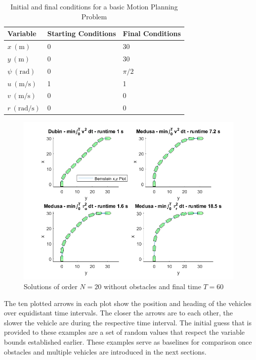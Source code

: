 \begin{table}[h!]
\centering
\begin{tabular}{|l|l|l|}
\hline
Variable & Starting Conditions & Final Conditions \\ \hline
$x\ (\si{\meter})$ & 0 & 30 \\
$y\ (\si{\meter})$ & 0 & 30 \\
$\psi\ (\si{\radian})$ & 0 & $\pi/2$ \\
$u\ (\si{\meter\per\second})$ & 1 & 1 \\
$v\ (\si{\meter\per\second})$ & 0 & 0 \\
$r\ (\si{\radian\per\second})$ & 0 & 0 \\
\hline
\end{tabular}
\caption{Initial and final conditions for a basic Motion Planning Problem}
\label{tab:firstproblem}
\end{table}

\begin{figure}[h!]
\centering
\includegraphics[width=\textwidth]{Images/results/noostaclesfigures.png}
\caption{Solutions of order $N=20$ without obstacles and final time $T=60$}
\label{fig:noobstaclesfigures}
\end{figure}

\par The ten plotted arrows in each plot show the position and heading of the vehicles over equidistant time intervals. The closer the arrows are to each other, the slower the vehicle are during the respective time interval. The initial guess that is provided to these examples are a set of random values that respect the variable bounds established earlier. These examples serve as baselines for comparison once obstacles and multiple vehicles are introduced in the next sections.


